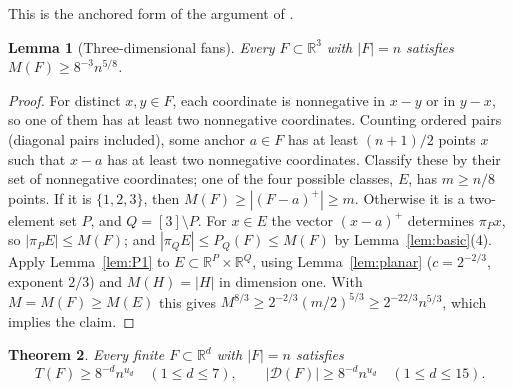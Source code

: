\documentclass[11pt]{amsart}
\newtheorem{theorem}{Theorem}[section]
\newtheorem{lemma}[theorem]{Lemma}
\theoremstyle{definition}
\theoremstyle{remark}
\newcommand{\R}{\mathbb{R}}
\newcommand{\Dp}{\mathcal{D}}
\newcommand{\Mf}{M}
\newcommand{\Tf}{T}
\begin{document}
This is the anchored form of the argument of \cite[Lemma~2.2]{HLP08}.

\begin{lemma}[Three-dimensional fans]\label{lem:3d}
Every $F\subset\R^3$ with $|F|=n$ satisfies $\Mf(F)\ge 8^{-3}n^{5/8}$.
\end{lemma}

\begin{proof}
For distinct $x,y\in F$, each coordinate is nonnegative in $x-y$ or in $y-x$, so one of them has at least two nonnegative coordinates. Counting ordered pairs (diagonal pairs included), some anchor $a\in F$ has at least $(n+1)/2$ points $x$ such that $x-a$ has at least two nonnegative coordinates. Classify these by their set of nonnegative coordinates; one of the four possible classes, $E$, has $m\ge n/8$ points. If it is $\{1,2,3\}$, then $\Mf(F)\ge|(F-a)^+|\ge m$. Otherwise it is a two-element set $P$, and $Q=[3]\setminus P$. For $x\in E$ the vector $(x-a)^+$ determines $\pi_Px$, so $|\pi_PE|\le\Mf(F)$; and $|\pi_QE|\le P_Q(F)\le\Mf(F)$ by Lemma~\ref{lem:basic}(4). Apply Lemma~\ref{lem:P1} to $E\subset\R^P\times\R^Q$, using Lemma~\ref{lem:planar} ($c=2^{-2/3}$, exponent $2/3$) and $\Mf(H)=|H|$ in dimension one. With $\Mf=\Mf(F)\ge\Mf(E)$ this gives $\Mf^{8/3}\ge2^{-2/3}(m/2)^{5/3}\ge 2^{-22/3}n^{5/3}$, which implies the claim.
\end{proof}

\begin{theorem}\label{thm:small-d}
Every finite $F\subset\R^d$ with $|F|=n$ satisfies
\[
\Tf(F)\ge 8^{-d}n^{u_d}\quad(1\le d\le7),\qquad |\Dp(F)|\ge8^{-d}n^{u_d}\quad(1\le d\le15).
\]
\end{theorem}
\end{document}
